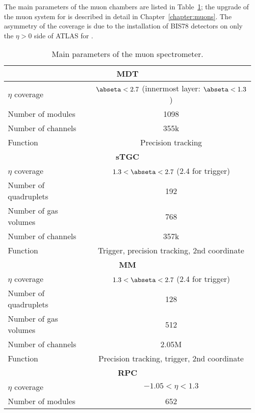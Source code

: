 \documentclass[cernpreprint, atlasdraft=false, UKenglish,british,orcidlogo, texmf, orcidlogo]{atlasdoc}
\begin{document}
 
 
 
The main parameters of the muon chambers are listed in Table~\ref{tab:muon_parameters}; the upgrade of the muon system for \RunThr is described in detail in Chapter~\ref{chapter:muons}. The asymmetry of the  coverage is due to the installation of \gls{BIS78} detectors on only the $\eta>0$ side of ATLAS for \RunThr.
 
\begin{table}[t]
\begin{center}
\caption{Main parameters of the  muon spectrometer.\label{tab:muon_parameters}}
\begin{tabular}{|l|c|}  \hline
\multicolumn{2}{|c|}{\textbf{\gls{MDT}}}              \\ \hline
$\eta$ coverage                 & $\abseta<2.7$ (innermost layer: $\abseta<1.3$)     \\ 
Number of modules       & \num{1098}             \\
Number of channels       &
355k \\
Function                 & Precision tracking \\ \hline
\multicolumn{2}{|c|}{\textbf{\gls{sTGC}}}                 \\ \hline
$\eta$ coverage                 & $1.3<\abseta<2.7$ (2.4 for trigger) \\
Number of quadruplets    & \num{192}                 \\
Number of gas volumes         & \num{768}\\
Number of channels       &
357k \\
Function                 & Trigger, precision tracking, 2nd coordinate \\ \hline
\multicolumn{2}{|c|}{\textbf{\gls{MM}}}                \\ \hline
$\eta$ coverage                 & $1.3<\abseta<2.7$ (2.4 for trigger)\\
Number of quadruplets    & \num{128}                \\
Number of gas volumes         & \num{512}                \\
Number of channels       &
2.05M \\
Function                 & Precision tracking, trigger, 2nd coordinate \\ \hline
\multicolumn{2}{|c|}{\textbf{\gls{RPC}}}                 \\ \hline 
$\eta$ coverage                 & $-1.05<\eta<1.3$     \\  
Number of modules       & \num{652}              \\

\end{tabular}
\end{center}
\end{table}
\end{document}
